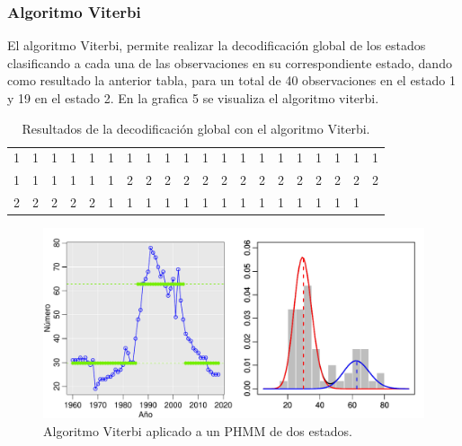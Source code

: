 \documentclass[a4paper]{article}\usepackage[]{graphicx}\usepackage[]{color}
\makeatletter
\def\maxwidth{ %
  \ifdim\Gin@nat@width>\linewidth
    \linewidth
  \else
    \Gin@nat@width
  \fi
}
\newenvironment{knitrout}{}{} %
\makeatother
\begin{document}
\subsubsection*{Algoritmo Viterbi}

El algoritmo Viterbi, permite realizar la decodificación global de los estados clasificando a cada una de las observaciones en su correspondiente estado, dando como resultado la anterior tabla, para un total de 40 observaciones en el estado 1 y 19 en el estado 2. En la grafica 5 se visualiza el algoritmo viterbi.

\begin{table}[ht]
\centering
\begin{tabular}{rrrrrrrrrrrrrrrrrrrr}
  \hline
  \hline
1 & 1 & 1 & 1 & 1 & 1 & 1 & 1 & 1 & 1 & 1 & 1 & 1 & 1 & 1 & 1 & 1 & 1 & 1 & 1 \\ 
  1 & 1 & 1 & 1 & 1 & 1 & 2 & 2 & 2 & 2 & 2 & 2 & 2 & 2 & 2 & 2 & 2 & 2 & 2 & 2 \\ 
  2 & 2 & 2 & 2 & 2 & 1 & 1 & 1 & 1 & 1 & 1 & 1 & 1 & 1 & 1 & 1 & 1 & 1 & 1 &  \\ 
   \hline
\end{tabular}
\caption{Resultados de la decodificación global con el algoritmo Viterbi.} 
\end{table}


\begin{knitrout}
\color{fgcolor}\begin{figure}
\includegraphics[width=\maxwidth]{figure/unnamed-chunk-18-1} \caption[Algoritmo Viterbi aplicado a un PHMM de dos estados]{Algoritmo Viterbi aplicado a un PHMM de dos estados.}\label{fig:unnamed-chunk-18}
\end{figure}


\end{knitrout}
\end{document}
